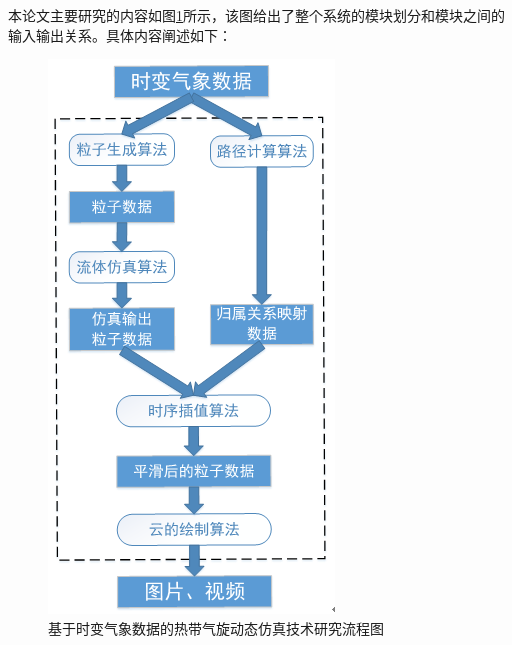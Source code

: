 本论文主要研究的内容如图\ref{fig:research_contents}所示，该图给出了整个系统的模块划分和模块之间的输入输出关系。具体内容阐述如下：
\begin{figure}[h!]
	\centering
	\includegraphics[width = 150bp]{figure/researchContemts.png}
	\caption{基于时变气象数据的热带气旋动态仿真技术研究流程图}
	\label{fig:research_contents}
\end{figure}

